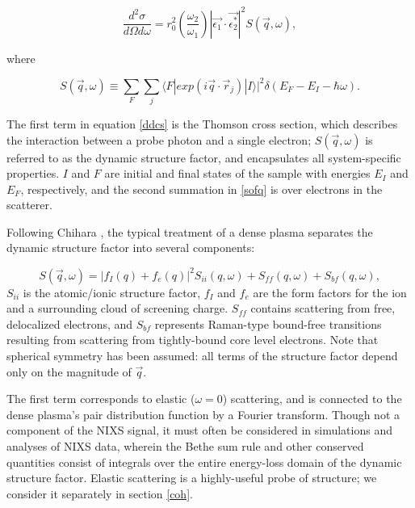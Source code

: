 \documentclass [11pt, proquest, article] {uwthesis}[2016/11/22]
\begin{document}
\begin{equation} \label{ddcs}
\frac{d^2\sigma}{d\Omega d\omega} = r_0^2 (\frac{\omega_2}{\omega_1}) |\vec{\epsilon_1} \cdot \vec{\epsilon_2^*}|^2 S(\vec{q}, \omega),
\end{equation}

where 


\begin{equation} \label{sofq}
S(\vec{q}, \omega) \equiv \sum_F  \sum_j\langle F|  exp(i \vec{q} \cdot \vec{r}_j) |I\rangle |^2 \delta(E_F - E_I - \hbar \omega).
\end{equation}

The first term in equation \ref{ddcs} is the Thomson cross section, which describes the interaction between a probe photon and a single electron; $S(\vec{q}, \omega)$ is referred to as the dynamic structure factor, and encapsulates all system-specific properties. $I$ and $F$ are initial and final states of the sample with energies $E_I$ and $E_F$, respectively, and the second summation in \ref{sofq} is over electrons in the scatterer.

Following Chihara \cite{chihara2000interaction}, the typical treatment of a dense plasma separates the dynamic structure factor into several components:

\begin{equation}
S(\vec{q}, \omega) = |f_I(q) + f_e(q)|^2 S_{ii}(q, \omega) + S_{ff}(q, \omega) + S_{bf}(q, \omega),
\end{equation}
$S_{ii}$ is the atomic/ionic structure factor, $f_I$ and $f_e$ are the form factors for the ion and a surrounding cloud of screening charge. \cite{chihara2000interaction} $S_{ff}$ contains scattering from free, delocalized electrons, and $S_{bf}$ represents Raman-type bound-free transitions resulting from scattering from tightly-bound core level electrons. Note that spherical symmetry has been assumed: all terms of the structure factor depend only on the magnitude of $\vec{q}$.

The first term corresponds to elastic ($\omega = 0$) scattering, and is connected to the dense plasma's pair distribution function by a Fourier transform. Though not a component of the NIXS signal, it must often be considered in simulations and analyses of NIXS data, wherein the Bethe sum rule and other conserved quantities consist of integrals over the entire energy-loss domain of the dynamic structure factor. \cite{mattern2013theoretical} Elastic scattering is a highly-useful probe of structure; we consider it separately in section \ref{coh}. 
\end{document}
